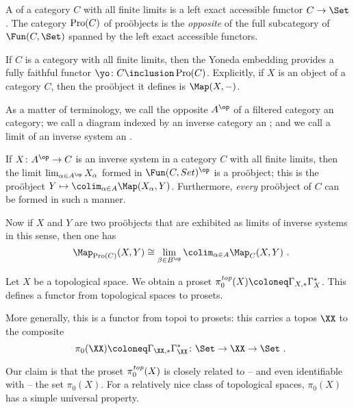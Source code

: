 \begin{dfn}
	A  of a category $ C $ with all finite limits is a left exact accessible functor $ C \to \Set $.
	The category $ \operatorname{Pro}(C) $ of proöbjects is the \emph{opposite} of the full subcategory of $ \Fun(C, \Set) $ spanned by the left exact accessible functors.
\end{dfn}

\begin{exm}
	If $ C $ is a category with all finite limits, then the Yoneda embedding provides a fully faithful functor $ \yo \colon C \inclusion \Pro(C) $.
	Explicitly, if $ X $ is an object of a category $ C $, then the proöbject it defines is $ \Map(X, -) $.
\end{exm}

\begin{exm}
	As a matter of terminology, we call the opposite $ A^{\op} $ of a filtered category an  category;
	we call a diagram indexed by an inverse category an ;
	and we call a limit of an inverse system an .

	If $ X \colon A^{\op} \to C $ is an inverse system in a category $ C $ with all finite limits, then the limit $ \lim_{\alpha \in A^{\op}} X_{\alpha} $ formed in $ \Fun(C, Set)^{\op} $ is a proöbject;
	this is the proöbject $ Y \mapsto \colim_{\alpha \in A} \Map(X_{\alpha}, Y) $.
	Furthermore, \emph{every} proöbject of $ C $ can be formed in such a manner.

	Now if $ X $ and $ Y $ are two proöbjects that are exhibited as limits of inverse systems in this sense, then one has
	\[
		\Map_{\Pro(C)}(X, Y) \cong \lim_{\beta \in B^{\op}} \colim_{\alpha \in A} \Map_C(X, Y) \period
	\]
\end{exm}

\begin{exm}
	Let $ X $ be a topological space.
	We obtain a proset $ \pi^{\toptextit}_0(X) \coloneq \Gamma_{X, \ast}\Gammaupperstar_X $.
	This defines a functor from topological spaces to prosets.

	More generally, this is a functor from topoi to prosets:
	this carries a topos $ \XX $ to the composite
	\[
		\pi_0(\XX) \coloneq \Gamma_{\XX, \ast} \Gammaupperstar_{\XX} \colon \Set \to \XX \to \Set \period
	\]
\end{exm}

Our claim is that the proset $ \pi_0^{\textit{top}}(X) $ is closely related to -- and even identifiable with -- the set $ \pi_0(X) $.
For a relatively nice class of topological spaces, $ \pi_0(X) $ has a simple universal property.

